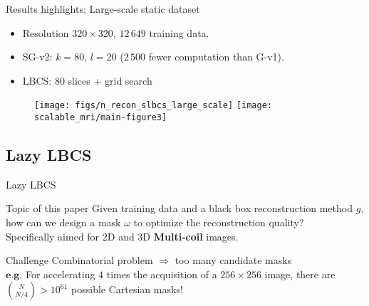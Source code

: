  \begin{frame}{Results highlights: Large-scale static dataset}
    \begin{itemize}
        \item Resolution $320\times 320$, $12\,649$ training data.
        \item SG-v2: $k=80$, $l=20$ ($2\,500$ fewer computation than G-v1).
        \item LBCS: $80$ slices + grid search
    \end{itemize}
    \begin{figure}
        \centering
        \texttt{[image: figs/n\_recon\_slbcs\_large\_scale]}%
        \hfill
        \texttt{[image: scalable\_mri/main-figure3]}
    \end{figure}
    
\end{frame}

\subsection{Lazy LBCS}
\begin{frame}{Lazy LBCS}

 \begin{block}{Topic of this paper}
 Given training data and a black box reconstruction method $g$, how can we design a mask $\omega$ to optimize the reconstruction quality?\\[2mm]
Specifically aimed for 2D and 3D \textbf{Multi-coil} images.
 \end{block}

 \begin{block}{Challenge}
 Combinatorial problem $\Rightarrow$ too many candidate masks\\[.3cm]
 $\mathbf{e.g.}$  For accelerating $4$ times the acquisition of a $256\times 256$ image, there are ${N \choose N/4} > 10^{61}$ possible Cartesian masks!

 \end{block}
\end{frame}

